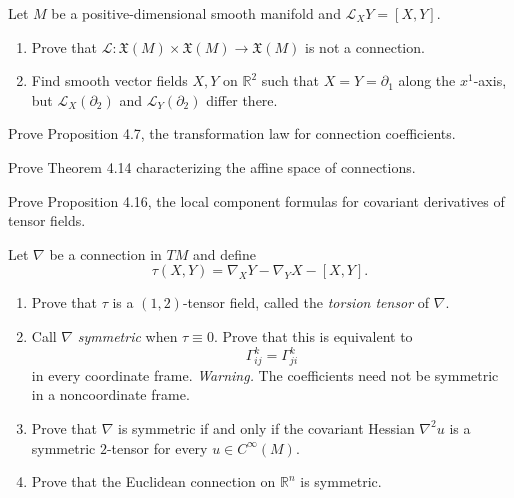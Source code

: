 \begin{exercise}
\label{prob:lie-derivative-not-connection}
Let $M$ be a positive-dimensional smooth manifold and
$\mathcal L_XY=[X,Y]$.
\begin{enumerate}
\item[(a)] Prove that
$\mathcal L\colon\mathfrak X(M)\times\mathfrak X(M)\to\mathfrak X(M)$ is not a
connection.
\item[(b)] Find smooth vector fields $X,Y$ on $\mathbb R^2$ such that
$X=Y=\partial_1$ along the $x^1$-axis, but
$\mathcal L_X(\partial_2)$ and $\mathcal L_Y(\partial_2)$ differ there.
\end{enumerate}
\end{exercise}

\begin{exercise}
\label{prob:transformation-law-connection}
\leanok
Prove Proposition 4.7, the transformation law for connection coefficients.
\end{exercise}

\begin{exercise}
\label{prob:characterizing-connections}
Prove Theorem 4.14 characterizing the affine space of connections.
\end{exercise}

\begin{exercise}
\label{prob:tensor-field-formulas}
Prove Proposition 4.16, the local component formulas for covariant derivatives of
tensor fields.
\end{exercise}

\begin{exercise}
\label{prob:torsion-tensor}
Let $\nabla$ be a connection in $TM$ and define
\[
\tau(X,Y)=\nabla_XY-\nabla_YX-[X,Y].
\]
\begin{enumerate}
\item[(a)] Prove that $\tau$ is a $(1,2)$-tensor field, called the
\emph{torsion tensor} of $\nabla$.
\item[(b)] Call $\nabla$ \emph{symmetric} when $\tau\equiv0$. Prove that this is
equivalent to
\[
\Gamma^k_{ij}=\Gamma^k_{ji}
\]
in every coordinate frame. \emph{Warning.} The coefficients need not be symmetric
in a noncoordinate frame.
\item[(c)] Prove that $\nabla$ is symmetric if and only if the covariant Hessian
$\nabla^2u$ is a symmetric $2$-tensor for every $u\in C^\infty(M)$.
\item[(d)] Prove that the Euclidean connection on $\mathbb R^n$ is symmetric.
\end{enumerate}
\end{exercise}

